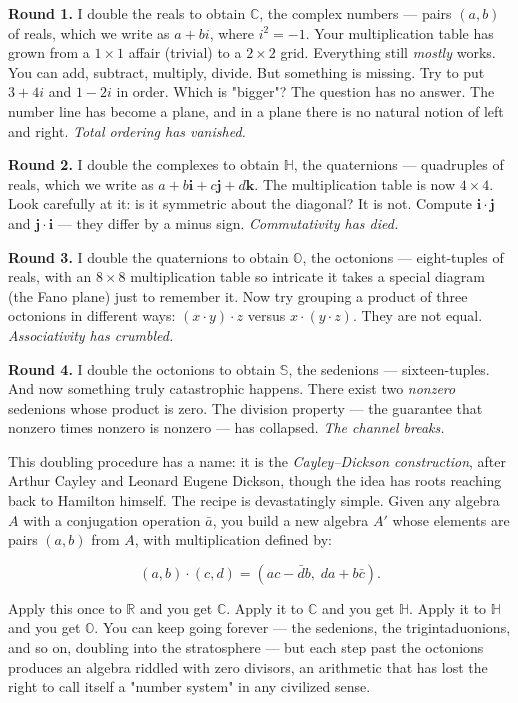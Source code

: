 \textbf{Round 1.} I double the reals to obtain $\mathbb{C}$, the complex numbers --- pairs $(a, b)$ of reals, which we write as $a + bi$, where $i^2 = -1$. Your multiplication table has grown from a $1 \times 1$ affair (trivial) to a $2 \times 2$ grid. Everything still \textit{mostly} works. You can add, subtract, multiply, divide. But something is missing. Try to put $3 + 4i$ and $1 - 2i$ in order. Which is "bigger"? The question has no answer. The number line has become a plane, and in a plane there is no natural notion of left and right. \textit{Total ordering has vanished.}

\textbf{Round 2.} I double the complexes to obtain $\mathbb{H}$, the quaternions --- quadruples of reals, which we write as $a + b\mathbf{i} + c\mathbf{j} + d\mathbf{k}$. The multiplication table is now $4 \times 4$. Look carefully at it: is it symmetric about the diagonal? It is not. Compute $\mathbf{i} \cdot \mathbf{j}$ and $\mathbf{j} \cdot \mathbf{i}$ --- they differ by a minus sign. \textit{Commutativity has died.}

\textbf{Round 3.} I double the quaternions to obtain $\mathbb{O}$, the octonions --- eight-tuples of reals, with an $8 \times 8$ multiplication table so intricate it takes a special diagram (the Fano plane) just to remember it. Now try grouping a product of three octonions in different ways: $(x \cdot y) \cdot z$ versus $x \cdot (y \cdot z)$. They are not equal. \textit{Associativity has crumbled.}

\textbf{Round 4.} I double the octonions to obtain $\mathbb{S}$, the sedenions --- sixteen-tuples. And now something truly catastrophic happens. There exist two \textit{nonzero} sedenions whose product is zero. The division property --- the guarantee that nonzero times nonzero is nonzero --- has collapsed. \textit{The channel breaks.}


This doubling procedure has a name: it is the \textit{Cayley--Dickson construction}, after Arthur Cayley and Leonard Eugene Dickson, though the idea has roots reaching back to Hamilton himself. The recipe is devastatingly simple. Given any algebra $A$ with a conjugation operation $\bar{a}$, you build a new algebra $A'$ whose elements are pairs $(a, b)$ from $A$, with multiplication defined by:

\[(a, b) \cdot (c, d) = (ac - \bar{d}b,\; da + b\bar{c}).\]

Apply this once to $\mathbb{R}$ and you get $\mathbb{C}$. Apply it to $\mathbb{C}$ and you get $\mathbb{H}$. Apply it to $\mathbb{H}$ and you get $\mathbb{O}$. You can keep going forever --- the sedenions, the trigintaduonions, and so on, doubling into the stratosphere --- but each step past the octonions produces an algebra riddled with zero divisors, an arithmetic that has lost the right to call itself a "number system" in any civilized sense.


